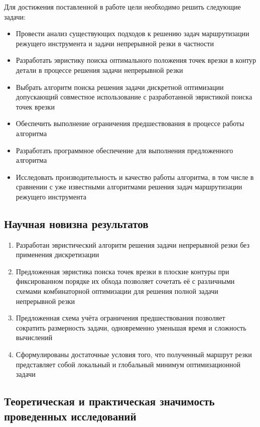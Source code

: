 \documentclass[14pt]{extarticle}
\theoremstyle{plain}%
\theoremstyle{remark}
\begin{document}
Для достижения поставленной в работе цели необходимо решить следующие задачи:
\begin{itemize}
  \item
  Провести анализ существующих подходов к решению
  задач маршрутизации режущего инструмента
  и задачи непрерывной резки в частности
  \item
  Разработать эвристику поиска оптимального положения
  точек врезки в контур детали в процессе решения задачи
  непрерывной резки
  \item
  Выбрать алгоритм поиска решения задачи дискретной оптимизации
  допускающий совместное использование
  с разработанной эвристикой поиска точек врезки
  \item
  Обеспечить выполнение ограничения предшествования
  в процессе работы алгоритма
  \item
  Разработать программное обеспечение для
  выполнения предложенного алгоритма
  \item
  Исследовать производительность и качество работы
  алгоритма,
  в том числе в сравнении с уже известными
  алгоритмами решения задач
  маршрутизации режущего инструмента
\end{itemize}

\subsection*{Научная новизна результатов}

\begin{enumerate}
  \item
  Разработан эвристический алгоритм
  решения задачи непрерывной резки
  без применения дискретизации
  \item
  Предложенная эвристика поиска точек врезки
  в плоские контуры
  при фиксированном порядке их обхода
  позволяет сочетать её с различными
  схемами комбинаторной оптимизации
  для решения полной задачи непрерывной резки
  \item
  Предложенная схема учёта
  ограничения предшествования
  позволяет сократить размерность задачи,
  одновременно уменьшая время и сложность вычислений
  \item
  Сформулированы достаточные условия того,
  что полученный маршрут резки
  представляет собой локальный и глобальный
  минимум оптимизационной задачи
\end{enumerate}

\subsection*{Теоретическая и практическая значимость проведенных исследований}
\end{document}
